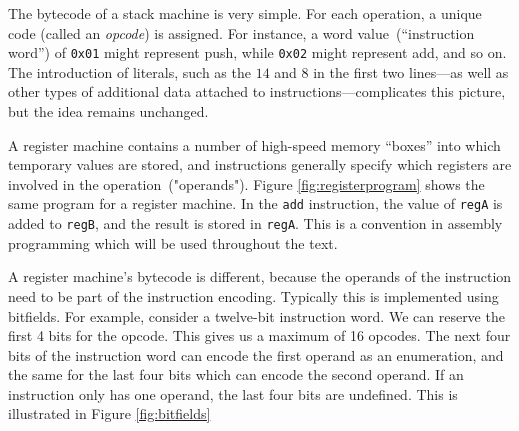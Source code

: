 			The bytecode of a stack machine is very simple. For each operation, a unique code (called an \emph{opcode}) is assigned. For instance, a word value~(``instruction word'') of \texttt{0x01} might represent push, while \texttt{0x02} might represent add, and so on. The introduction of literals, such as the $14$ and $8$ in the first two lines---as well as other types of additional data attached to instructions---complicates this picture, but the idea remains unchanged.
		
			A register machine contains a number of high-speed memory ``boxes'' into which temporary values are stored, and instructions generally specify which registers are involved in the operation~("operands"). Figure \ref{fig:registerprogram} shows the same program for a register machine. In the \texttt{add} instruction, the value of \texttt{regA} is added to \texttt{regB}, and the result is stored in \texttt{regA}. This is a convention in assembly programming which will be used throughout the text.
		
			A register machine's bytecode is different, because the operands of the instruction need to be part of the instruction encoding. Typically this is implemented using bitfields. For example, consider a twelve-bit instruction word. We can reserve the first 4 bits for the opcode. This gives us a maximum of 16 opcodes. The next four bits of the instruction word can encode the first operand as an enumeration, and the same for the last four bits which can encode the second operand. If an instruction only has one operand, the last four bits are undefined. This is illustrated in Figure \ref{fig:bitfields}
			
			
